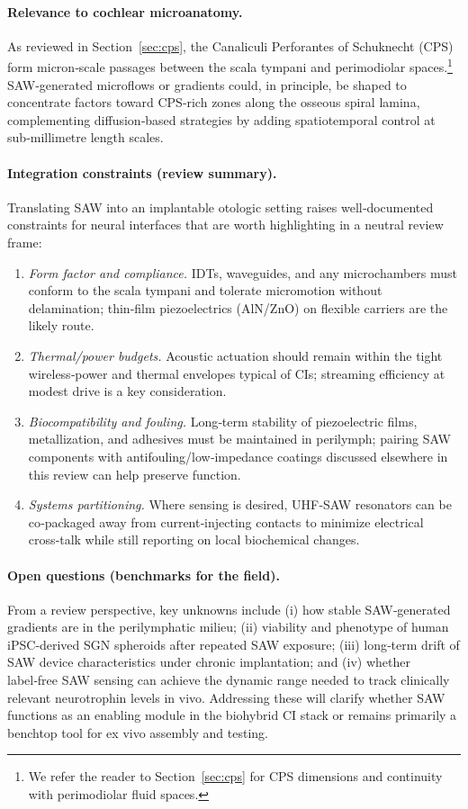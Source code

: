 \paragraph{Relevance to cochlear microanatomy.} As reviewed in Section~\ref{sec:cps}, the Canaliculi Perforantes of Schuknecht (CPS) form micron‑scale passages between the scala tympani and perimodiolar spaces.\footnote{We refer the reader to Section~\ref{sec:cps} for CPS dimensions and continuity with perimodiolar fluid spaces.} SAW‑generated microflows or gradients could, in principle, be shaped to concentrate factors toward CPS‑rich zones along the osseous spiral lamina, complementing diffusion‑based strategies by adding spatiotemporal control at sub‑millimetre length scales.\cite{Ding2013,Ahmed2016_LabChip}

\paragraph{Integration constraints (review summary).} Translating SAW into an implantable otologic setting raises well‑documented constraints for neural interfaces that are worth highlighting in a neutral review frame:
\begin{enumerate}
	\item \emph{Form factor and compliance.} IDTs, waveguides, and any microchambers must conform to the scala tympani and tolerate micromotion without delamination; thin‑film piezoelectrics (AlN/ZnO) on flexible carriers are the likely route.\cite{Campbell1998}
	\item \emph{Thermal/power budgets.} Acoustic actuation should remain within the tight wireless‑power and thermal envelopes typical of CIs; streaming efficiency at modest drive is a key consideration.\cite{Ding2013}
	\item \emph{Biocompatibility and fouling.} Long‑term stability of piezoelectric films, metallization, and adhesives must be maintained in perilymph; pairing SAW components with antifouling/low‑impedance coatings discussed elsewhere in this review can help preserve function.\cite{Mandal2022}
	\item \emph{Systems partitioning.} Where sensing is desired, UHF‑SAW resonators can be co‑packaged away from current‑injecting contacts to minimize electrical cross‑talk while still reporting on local biochemical changes.\cite{Agostini2021_UHFSAW}
\end{enumerate}

\paragraph{Open questions (benchmarks for the field).} From a review perspective, key unknowns include (i) how stable SAW‑generated gradients are in the perilymphatic milieu; (ii) viability and phenotype of human iPSC‑derived SGN spheroids after repeated SAW exposure; (iii) long‑term drift of SAW device characteristics under chronic implantation; and (iv) whether label‑free SAW sensing can achieve the dynamic range needed to track clinically relevant neurotrophin levels in vivo.\cite{rufo2022,Agostini2021_UHFSAW} Addressing these will clarify whether SAW functions as an enabling module in the biohybrid CI stack or remains primarily a benchtop tool for ex vivo assembly and testing.

